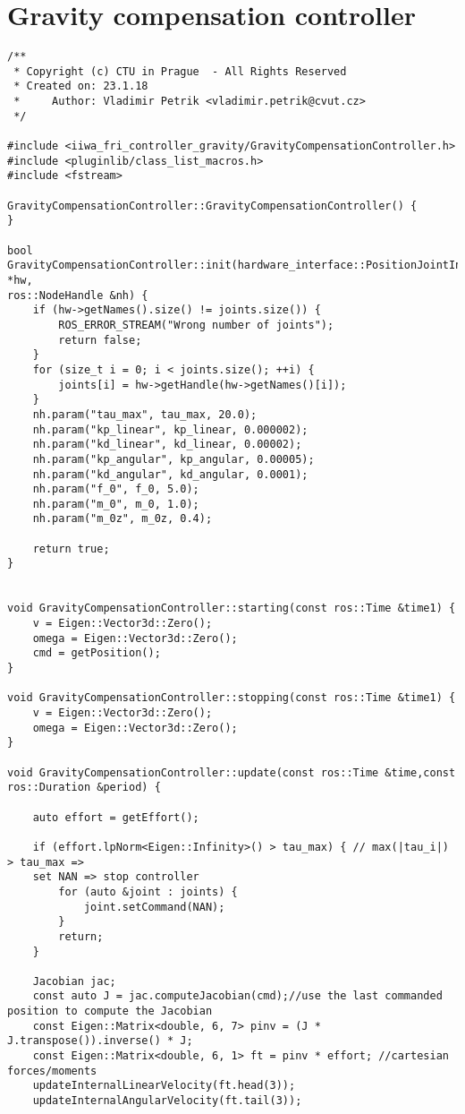\chapter{Gravity compensation controller}

\begin{lstlisting}
/**
 * Copyright (c) CTU in Prague  - All Rights Reserved
 * Created on: 23.1.18
 *     Author: Vladimir Petrik <vladimir.petrik@cvut.cz>
 */

#include <iiwa_fri_controller_gravity/GravityCompensationController.h>
#include <pluginlib/class_list_macros.h>
#include <fstream>

GravityCompensationController::GravityCompensationController() {
}

bool GravityCompensationController::init(hardware_interface::PositionJointInterface *hw,
ros::NodeHandle &nh) {
    if (hw->getNames().size() != joints.size()) {
        ROS_ERROR_STREAM("Wrong number of joints");
        return false;
    }
    for (size_t i = 0; i < joints.size(); ++i) {
        joints[i] = hw->getHandle(hw->getNames()[i]);
    }
    nh.param("tau_max", tau_max, 20.0);
    nh.param("kp_linear", kp_linear, 0.000002);
    nh.param("kd_linear", kd_linear, 0.00002);
    nh.param("kp_angular", kp_angular, 0.00005);
    nh.param("kd_angular", kd_angular, 0.0001);
    nh.param("f_0", f_0, 5.0);
    nh.param("m_0", m_0, 1.0);
    nh.param("m_0z", m_0z, 0.4);

    return true;
}


void GravityCompensationController::starting(const ros::Time &time1) {
    v = Eigen::Vector3d::Zero();
    omega = Eigen::Vector3d::Zero();
    cmd = getPosition();
}

void GravityCompensationController::stopping(const ros::Time &time1) {
    v = Eigen::Vector3d::Zero();
    omega = Eigen::Vector3d::Zero();
}

void GravityCompensationController::update(const ros::Time &time,const ros::Duration &period) {

    auto effort = getEffort();

    if (effort.lpNorm<Eigen::Infinity>() > tau_max) { // max(|tau_i|) > tau_max => 
	set NAN => stop controller
        for (auto &joint : joints) {
            joint.setCommand(NAN);
        }
        return;
    }

    Jacobian jac;
    const auto J = jac.computeJacobian(cmd);//use the last commanded position to compute the Jacobian
    const Eigen::Matrix<double, 6, 7> pinv = (J * J.transpose()).inverse() * J;
    const Eigen::Matrix<double, 6, 1> ft = pinv * effort; //cartesian forces/moments
    updateInternalLinearVelocity(ft.head(3));
    updateInternalAngularVelocity(ft.tail(3));


\end{lstlisting}
